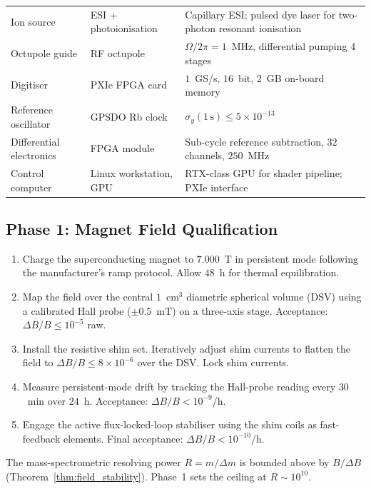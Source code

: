 \begin{table}[!htbp]
\begin{tabular}{p{}p{}p{}}
\addlinespace
Ion source & ESI + photoionisation & Capillary ESI; pulsed dye laser for two-photon resonant ionisation \\
\addlinespace
Octupole guide & RF octupole & $\Omega/2\pi = 1$~MHz, differential pumping $4$ stages \\
\addlinespace
Digitiser & PXIe FPGA card & $1$~GS/s, $16$~bit, $2$~GB on-board memory \\
\addlinespace
Reference oscillator & GPSDO Rb clock & $\sigma_y(1\,\text{s}) \le 5\times10^{-13}$ \\
\addlinespace
Differential electronics & FPGA module & Sub-cycle reference subtraction, $32$ channels, $250$~MHz \\
\addlinespace
Control computer & Linux workstation, GPU & RTX-class GPU for shader pipeline; PXIe interface \\
\bottomrule
\end{tabular}
\end{table}

\subsection{Phase 1: Magnet Field Qualification}
\label{subsec:phase1_magnet}

\begin{enumerate}[leftmargin=1.5em]
    \item Charge the superconducting magnet to $7.000$~T in persistent mode following the manufacturer's ramp protocol. Allow $48$~h for thermal equilibration.
    \item Map the field over the central $1$~cm$^3$ diametric spherical volume (DSV) using a calibrated Hall probe ($\pm 0.5$~mT) on a three-axis stage. Acceptance: $\Delta B/B \le 10^{-5}$ raw.
    \item Install the resistive shim set. Iteratively adjust shim currents to flatten the field to $\Delta B/B \le 8\times10^{-6}$ over the DSV. Lock shim currents.
    \item Measure persistent-mode drift by tracking the Hall-probe reading every $30$~min over $24$~h. Acceptance: $\Delta B/B < 10^{-9}$/h.
    \item Engage the active flux-locked-loop stabiliser using the shim coils as fast-feedback elements. Final acceptance: $\Delta B/B < 10^{-10}$/h.
\end{enumerate}

The mass-spectrometric resolving power $R = m/\Delta m$ is bounded above by $B/\Delta B$ (Theorem~\ref{thm:field_stability}). Phase~1 sets the ceiling at $R \sim 10^{10}$.

